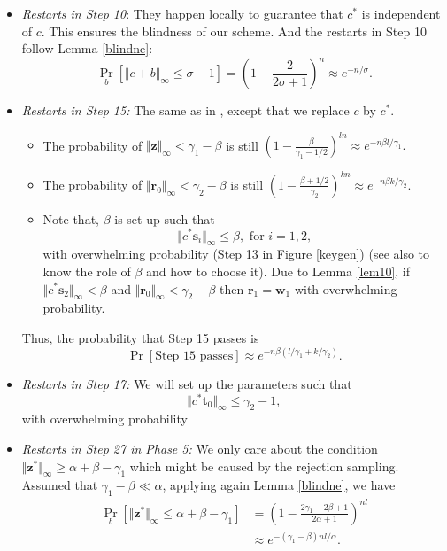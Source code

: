 \documentclass[conference]{IEEEtran}
\begin{document}
	\begin{itemize}
		\item \textit{Restarts in Step 10}: They happen locally to guarantee that $c^*$ is independent  of $c$. This ensures the blindness of our scheme. And the restarts in Step 10 follow Lemma \ref{blindne}: \begin{equation}\label{k}
		\Pr_{b }[\Vert c+b \Vert_{\infty} \leq \sigma-1]=\left(1-\frac{2}{2\sigma+1} \right)^n \approx e^{-n /\sigma}.
		\end{equation}
		
		\item \textit{Restarts in Step 15:} The same as in \cite[Subsection 3.3]{DKL+19}, except that we replace $c$ by $c^*$. 
		\begin{itemize}
			\item The probability of $\Vert\mathbf{z} \Vert_{\infty} < \gamma_1-\beta$ is still $\left(1-\frac{\beta}{\gamma_1-1/2} \right)^{ln} \approx e^{-n\beta l/\gamma_1}.$
			\item The probability of $\Vert\mathbf{r}_0 \Vert_{\infty} < \gamma_2-\beta$ is still $\left(1-\frac{\beta+1/2}{\gamma_2} \right)^{kn} \approx e^{-n\beta k/\gamma_2}.$
			\item Note that, $\beta$ is set up such that \begin{equation}\label{k2}
			\Vert c^*\mathbf{s}_i \Vert_{\infty} \leq \beta, \text{ for } i=1,2,
			\end{equation} with overwhelming probability (Step 13 in Figure \ref{keygen}) (see also \cite[Section 4.4]{DLL+17} to know the role of $\beta$ and how to choose it). Due to Lemma \ref{lem10}, if $\Vert c^*\mathbf{s}_2 \Vert_{\infty} < \beta$ and $\Vert\mathbf{r}_0 \Vert_{\infty} < \gamma_2-\beta$ then $\mathbf{r}_1=\mathbf{w}_1$ with overwhelming probability.
		\end{itemize}
		Thus, the probability that Step 15 passes is \begin{equation}\label{k3}
		\Pr[\text{Step 15 passes}]\approx e^{-n\beta( l/\gamma_1+k/\gamma_2)}.
		\end{equation}
		\item  \textit{Restarts in Step 17:}  We will set up the parameters such that \begin{equation}\label{k16}
		\Vert c^*\mathbf{t}_0 \Vert_{\infty} \leq \gamma_2-1,
		\end{equation} with overwhelming probability
		
		\item  \textit{Restarts in Step 27 in Phase 5:}  We only care about the condition $\Vert\mathbf{z}^* \Vert_{\infty} \geq \alpha+\beta-\gamma_1$ which might be caused by the rejection sampling. Assumed that $\gamma_1-\beta \ll \alpha$, applying again Lemma \ref{blindne}, we have \begin{equation}\label{k4}
		\begin{split}
		\Pr_{b }[\Vert \mathbf{z}^* \Vert_{\infty} \leq \alpha +\beta-\gamma_1] &=\left(1-\frac{2\gamma_1-2\beta+ 1}{2\alpha+1} \right)^{nl}\\& \approx e^{-(\gamma_1-\beta) nl/\alpha}.
		\end{split}
		\end{equation}
	\end{itemize}
	
\end{document}
